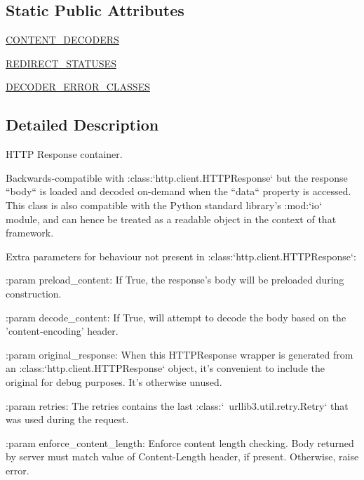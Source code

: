 \subsection*{Static Public Attributes}
\begin{DoxyCompactItemize}
\item 
\hyperlink{classpip_1_1__vendor_1_1urllib3_1_1response_1_1HTTPResponse_a1b5cb427b50b47ae9d10b199a4361b4e}{C\+O\+N\+T\+E\+N\+T\+\_\+\+D\+E\+C\+O\+D\+E\+RS}
\item 
\hyperlink{classpip_1_1__vendor_1_1urllib3_1_1response_1_1HTTPResponse_a05b6c54db61bd73ab25e2ef9afcea82a}{R\+E\+D\+I\+R\+E\+C\+T\+\_\+\+S\+T\+A\+T\+U\+S\+ES}
\item 
\hyperlink{classpip_1_1__vendor_1_1urllib3_1_1response_1_1HTTPResponse_aad2ee1a5838634bb047e421fdff5c05f}{D\+E\+C\+O\+D\+E\+R\+\_\+\+E\+R\+R\+O\+R\+\_\+\+C\+L\+A\+S\+S\+ES}
\end{DoxyCompactItemize}


\subsection{Detailed Description}
\begin{DoxyVerb}HTTP Response container.

Backwards-compatible with :class:`http.client.HTTPResponse` but the response ``body`` is
loaded and decoded on-demand when the ``data`` property is accessed.  This
class is also compatible with the Python standard library's :mod:`io`
module, and can hence be treated as a readable object in the context of that
framework.

Extra parameters for behaviour not present in :class:`http.client.HTTPResponse`:

:param preload_content:
    If True, the response's body will be preloaded during construction.

:param decode_content:
    If True, will attempt to decode the body based on the
    'content-encoding' header.

:param original_response:
    When this HTTPResponse wrapper is generated from an :class:`http.client.HTTPResponse`
    object, it's convenient to include the original for debug purposes. It's
    otherwise unused.

:param retries:
    The retries contains the last :class:`~urllib3.util.retry.Retry` that
    was used during the request.

:param enforce_content_length:
    Enforce content length checking. Body returned by server must match
    value of Content-Length header, if present. Otherwise, raise error.
\end{DoxyVerb}
 

